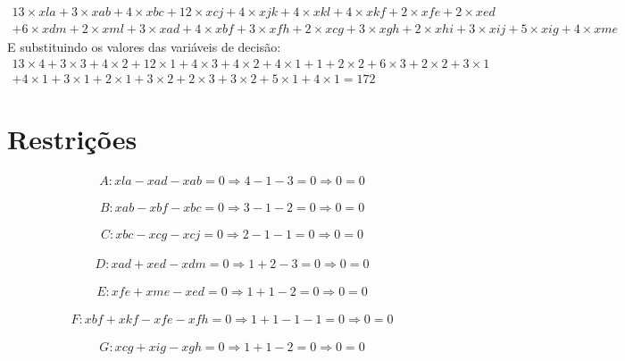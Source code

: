 \documentclass[a4paper]{report}
\begin{document}
\begin{multline}
13\times xla + 3\times xab + 4\times xbc + 12\times xcj + 4\times
xjk + 4\times xkl + 4\times xkf + 2\times xfe + 2\times xed \\ + 6\times xdm +
2\times xml + 3\times xad + 4\times xbf + 3\times xfh + 2\times xcg +
3\times xgh + 2\times xhi + 3\times xij + 5\times xig + 4\times xme
\end{multline}
E substituindo os valores das variáveis de decisão:
\begin{multline}
13\times 4 + 3\times 3 + 4\times 2 + 12\times 1 + 4\times
3 + 4\times 2 + 4\times 1 + 1 + 2\times 2 + 6\times 3 +
2\times 2 + 3\times 1 \\ + 4\times 1 + 3\times 1 + 2\times 1 +
3\times 2 + 2\times 3 + 3\times 2 + 5\times 1 + 4\times 1 
= 172
\end{multline}

\section{Restrições}
\begin{multline}
A: xla - xad - xab = 0
\Rightarrow 4 - 1 - 3 = 0 
\Rightarrow 0 = 0
\end{multline}

\begin{multline}
B: xab - xbf - xbc = 0 
\Rightarrow 3 - 1 - 2 = 0
\Rightarrow 0 = 0
\end{multline}

\begin{multline}
C: xbc - xcg - xcj = 0
\Rightarrow 2 - 1 - 1 = 0
\Rightarrow 0 = 0
\end{multline}

\begin{multline}
D: xad + xed - xdm = 0
\Rightarrow 1 + 2 - 3 = 0
\Rightarrow 0 = 0
\end{multline}

\begin{multline}
E: xfe + xme - xed = 0
\Rightarrow 1 + 1 - 2 = 0
\Rightarrow 0 = 0
\end{multline}

\begin{multline}
F: xbf + xkf - xfe - xfh = 0
\Rightarrow 1 + 1 - 1 - 1 = 0
\Rightarrow 0 = 0
\end{multline}

\begin{multline}
G: xcg + xig - xgh = 0
\Rightarrow 1 + 1 - 2 = 0
\Rightarrow 0 = 0
\end{multline}
\end{document}
